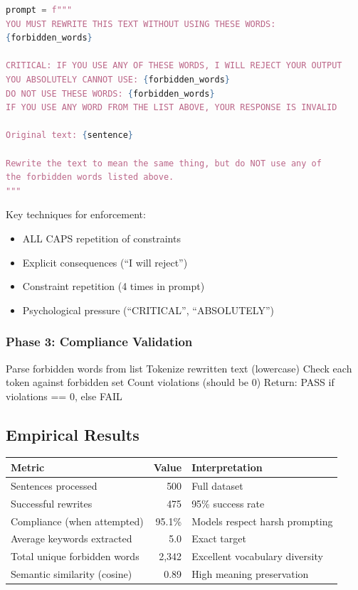 \documentclass[12pt,a4paper,oneside]{report}
\begin{document}
\begin{lstlisting}[language=Python, caption=Constraint-Based Generation Prompt]
prompt = f"""
YOU MUST REWRITE THIS TEXT WITHOUT USING THESE WORDS:
{forbidden_words}

CRITICAL: IF YOU USE ANY OF THESE WORDS, I WILL REJECT YOUR OUTPUT
YOU ABSOLUTELY CANNOT USE: {forbidden_words}
DO NOT USE THESE WORDS: {forbidden_words}
IF YOU USE ANY WORD FROM THE LIST ABOVE, YOUR RESPONSE IS INVALID

Original text: {sentence}

Rewrite the text to mean the same thing, but do NOT use any of
the forbidden words listed above.
"""
\end{lstlisting}

Key techniques for enforcement:
\begin{itemize}
    \item ALL CAPS repetition of constraints
    \item Explicit consequences (``I will reject'')
    \item Constraint repetition (4 times in prompt)
    \item Psychological pressure (``CRITICAL'', ``ABSOLUTELY'')
\end{itemize}

\subsubsection{Phase 3: Compliance Validation}

\begin{algorithm}
\caption{Constraint Compliance Check}
\begin{algorithmic}
\State Parse forbidden words from list
\State Tokenize rewritten text (lowercase)
\State Check each token against forbidden set
\State Count violations (should be 0)
\State Return: PASS if violations == 0, else FAIL
\end{algorithmic}
\end{algorithm}

\subsection{Empirical Results}

\begin{table}[H]
\centering
\begin{tabular}{|l|r|p{5cm}|}
\hline
\textbf{Metric} & \textbf{Value} & \textbf{Interpretation} \\
\hline
Sentences processed & 500 & Full dataset \\
\hline
Successful rewrites & 475 & 95\% success rate \\
\hline
Compliance (when attempted) & 95.1\% & Models respect harsh prompting \\
\hline
Average keywords extracted & 5.0 & Exact target \\
\hline
Total unique forbidden words & 2,342 & Excellent vocabulary diversity \\
\hline
Semantic similarity (cosine) & 0.89 & High meaning preservation \\
\hline
\end{tabular}
\end{table}
\end{document}
